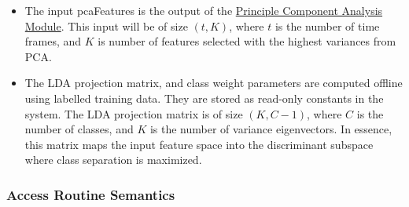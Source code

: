 \documentclass[12pt, titlepage]{article}
\begin{document}
\begin{itemize}
  \item The input pcaFeatures is the output of the \hyperref[MG-mPCA]{Principle
  Component Analysis Module}. This input will be of size $(t,K)$, where $t$ is
  the number of time frames, and $K$ is number of features selected with the
  highest variances from PCA.
  \item The LDA projection matrix, and class weight parameters are computed
  offline using labelled training data. They are stored as read-only constants
  in the system. The LDA projection matrix is of size $(K,C-1)$, where $C$ is
  the number of classes, and $K$ is the number of variance eigenvectors. In
  essence, this matrix maps the input feature space into the discriminant
  subspace where class separation is maximized.
  
\end{itemize}

\subsubsection{Access Routine Semantics}
\end{document}
